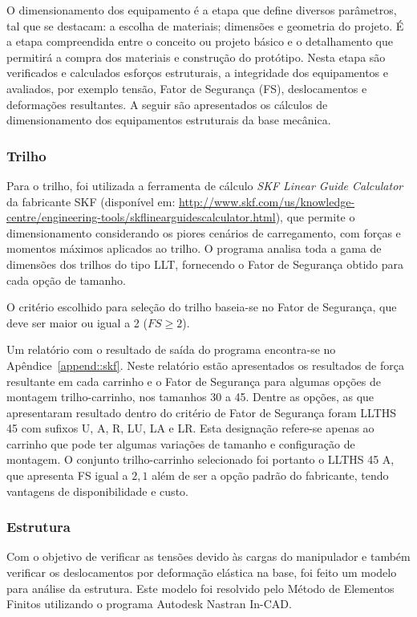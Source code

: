 O dimensionamento dos equipamento é a etapa que define diversos parâmetros, tal
que se destacam: a escolha de materiais; dimensões e geometria do projeto.
É a etapa compreendida entre o conceito ou projeto básico e o detalhamento que
permitirá a compra dos materiais e construção do protótipo. Nesta
etapa são verificados e calculados esforços estruturais, a integridade dos
equipamentos e avaliados, por exemplo tensão, Fator de Segurança (FS),
deslocamentos e deformações resultantes. A seguir são apresentados os cálculos
de dimensionamento dos equipamentos estruturais da base mecânica.

\subsubsection{Trilho}

Para o trilho, foi utilizada a ferramenta de cálculo
\textit{SKF Linear Guide Calculator} da fabricante SKF (disponível em:
\url{http://www.skf.com/us/knowledge-centre/engineering-tools/skflinearguidescalculator.html}),
que permite o dimensionamento considerando os piores cenários de carregamento,
com forças e momentos máximos aplicados ao trilho.
O programa analisa toda a gama de dimensões dos trilhos do tipo LLT, fornecendo
o Fator de Segurança obtido para cada opção de tamanho.

O critério escolhido para seleção do trilho baseia-se no Fator de Segurança, que
deve ser maior ou igual a 2 ($FS\geq2$). 

Um relatório com o resultado de saída do programa encontra-se no Apêndice~\ref{append::skf}. 
Neste relatório estão apresentados os resultados de força resultante em cada
carrinho e o Fator de Segurança para algumas opções de montagem trilho-carrinho,
nos tamanhos 30 a 45. Dentre as opções, as que apresentaram resultado dentro do
critério de Fator de Segurança foram LLTHS 45 com sufixos U, A, R, LU, LA e LR.
Esta designação refere-se apenas ao carrinho que pode ter algumas variações de
tamanho e configuração de montagem. O conjunto trilho-carrinho selecionado foi
portanto o LLTHS 45 A, que apresenta FS igual a $2,1$ além de ser a opção padrão
do fabricante, tendo vantagens de disponibilidade e custo.


\subsubsection{Estrutura}

Com o objetivo de verificar as tensões devido às cargas do manipulador e também
verificar os deslocamentos por deformação elástica na base, foi feito um modelo
para análise da estrutura. Este modelo foi resolvido pelo Método de
Elementos Finitos utilizando o programa Autodesk\textregistered{}
Nastran\textregistered{} In-CAD.

